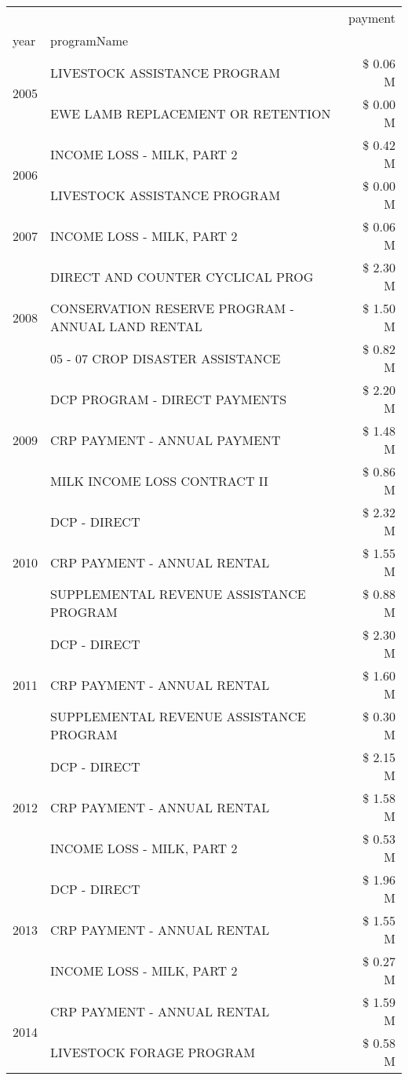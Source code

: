 \begin{tabular}{llr}
\toprule
 &  & payment \\
year & programName &  \\
\midrule
\multirow[t]{2}{*}{2005} & LIVESTOCK ASSISTANCE PROGRAM & \$ 0.06 M \\
 & EWE LAMB REPLACEMENT OR RETENTION & \$ 0.00 M \\
\cline{1-3}
\multirow[t]{2}{*}{2006} & INCOME LOSS - MILK, PART 2 & \$ 0.42 M \\
 & LIVESTOCK ASSISTANCE PROGRAM & \$ 0.00 M \\
\cline{1-3}
2007 & INCOME LOSS - MILK, PART 2 & \$ 0.06 M \\
\cline{1-3}
\multirow[t]{3}{*}{2008} & DIRECT AND COUNTER CYCLICAL PROG & \$ 2.30 M \\
 & CONSERVATION RESERVE PROGRAM - ANNUAL LAND RENTAL & \$ 1.50 M \\
 & 05 - 07 CROP DISASTER ASSISTANCE & \$ 0.82 M \\
\cline{1-3}
\multirow[t]{3}{*}{2009} & DCP PROGRAM - DIRECT PAYMENTS & \$ 2.20 M \\
 & CRP PAYMENT - ANNUAL PAYMENT & \$ 1.48 M \\
 & MILK INCOME LOSS CONTRACT II & \$ 0.86 M \\
\cline{1-3}
\multirow[t]{3}{*}{2010} & DCP - DIRECT & \$ 2.32 M \\
 & CRP PAYMENT - ANNUAL RENTAL & \$ 1.55 M \\
 & SUPPLEMENTAL REVENUE ASSISTANCE PROGRAM & \$ 0.88 M \\
\cline{1-3}
\multirow[t]{3}{*}{2011} & DCP - DIRECT & \$ 2.30 M \\
 & CRP PAYMENT - ANNUAL RENTAL & \$ 1.60 M \\
 & SUPPLEMENTAL REVENUE ASSISTANCE PROGRAM & \$ 0.30 M \\
\cline{1-3}
\multirow[t]{3}{*}{2012} & DCP - DIRECT & \$ 2.15 M \\
 & CRP PAYMENT - ANNUAL RENTAL & \$ 1.58 M \\
 & INCOME LOSS - MILK, PART 2 & \$ 0.53 M \\
\cline{1-3}
\multirow[t]{3}{*}{2013} & DCP - DIRECT & \$ 1.96 M \\
 & CRP PAYMENT - ANNUAL RENTAL & \$ 1.55 M \\
 & INCOME LOSS - MILK, PART 2 & \$ 0.27 M \\
\cline{1-3}
\multirow[t]{3}{*}{2014} & CRP PAYMENT - ANNUAL RENTAL & \$ 1.59 M \\
 & LIVESTOCK FORAGE PROGRAM & \$ 0.58 M \\

\end{tabular}
